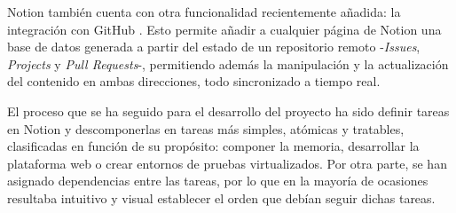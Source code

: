         Notion también cuenta con otra funcionalidad recientemente añadida: la integración con GitHub \cite{github}. Esto permite añadir a cualquier página de Notion una base de datos generada a partir del estado de un repositorio remoto -\textit{Issues}, \textit{Projects} y \textit{Pull Requests}-, permitiendo además la manipulación y la actualización del contenido en ambas direcciones, todo sincronizado a tiempo real. 

        El proceso que se ha seguido para el desarrollo del proyecto ha sido definir tareas en Notion y descomponerlas en tareas más simples, atómicas y tratables, clasificadas en función de su propósito: componer la memoria, desarrollar la plataforma web o crear entornos de pruebas virtualizados. Por otra parte, se han asignado dependencias entre las tareas, por lo que en la mayoría de ocasiones resultaba intuitivo y visual establecer el orden que debían seguir dichas tareas.

        \newpage

